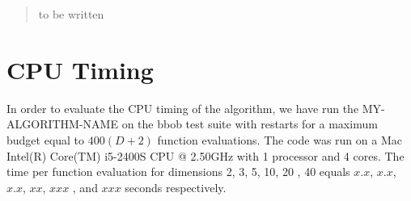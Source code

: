 \documentclass{sig-alternate}
\newcommand{\change}[1]{{\color{red} #1}}
\begin{document}

\maketitle
\begin{abstract}
to be written
\end{abstract}




%
%
%
\section{CPU Timing}
In order to evaluate the CPU timing of the algorithm, we have run the \change{MY-ALGORITHM-NAME} on the  \change{bbob test suite \cite{hansen2009fun}} with restarts for a maximum budget equal to \change{$400 (D + 2)$} function evaluations. The code was run on a \change{Mac Intel(R) Core(TM) i5-2400S CPU @ 2.50GHz} with \change{1} processor and \change{4} cores. The time per function evaluation for dimensions 2, 3, 5, 10, 20\change{, 40} equals \change{$x.x$}, \change{$x.x$}, \change{$x.x$}, \change{$xx$}, \change{$xxx$}\change{, and $xxx$} seconds respectively. 
\end{document}
